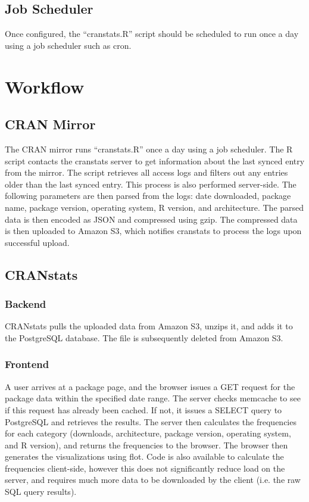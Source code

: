 \documentclass[12pt, titlepage]{article}
\begin{document}
\subsection{Job Scheduler}
Once configured, the ``cranstats.R'' script should be scheduled to run once a day using a job scheduler such as cron.


\section{Workflow}

\subsection{CRAN Mirror}
The CRAN mirror runs ``cranstats.R'' once a day using a job scheduler. The R script contacts the cranstats server to get information about the last synced entry from the mirror. The script retrieves all access logs and filters out any entries older than the last synced entry. This process is also performed server-side. The following parameters are then parsed from the logs: date downloaded, package name, package version, operating system, R version, and architecture. The parsed data is then encoded as JSON and compressed using gzip. The compressed data is then uploaded to Amazon S3, which notifies cranstats to process the logs upon successful upload.

\subsection{CRANstats}
\subsubsection{Backend}
CRANstats pulls the uploaded data from Amazon S3, unzips it, and adds it to the PostgreSQL database. The file is subsequently deleted from Amazon S3.
\subsubsection{Frontend}
A user arrives at a package page, and the browser issues a GET request for the package data within the specified date range. The server checks memcache to see if this request has already been cached. If not, it issues a SELECT query to PostgreSQL and retrieves the results. The server then calculates the frequencies for each category (downloads, architecture, package version, operating system, and R version), and returns the frequencies to the browser. The browser then generates the visualizations using flot. Code is also available to calculate the frequencies client-side, however this does not significantly reduce load on the server, and requires much more data to be downloaded by the client (i.e. the raw SQL query results).

\end{document}
